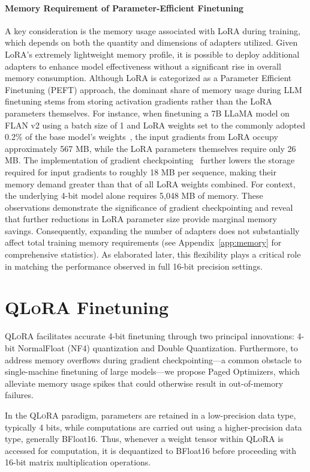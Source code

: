 \paragraph{Memory Requirement of Parameter-Efficient Finetuning} A key consideration is the memory usage associated with LoRA during training, which depends on both the quantity and dimensions of adapters utilized. Given LoRA’s extremely lightweight memory profile, it is possible to deploy additional adapters to enhance model effectiveness without a significant rise in overall memory consumption. Although LoRA is categorized as a Parameter Efficient Finetuning (PEFT) approach, the dominant share of memory usage during LLM finetuning stems from storing activation gradients rather than the LoRA parameters themselves. For instance, when finetuning a 7B LLaMA model on FLAN v2 using a batch size of 1 and LoRA weights set to the commonly adopted 0.2\% of the base model’s weights~\citep{hu2021lora,liu2022few}, the input gradients from LoRA occupy approximately 567 MB, while the LoRA parameters themselves require only 26 MB. The implementation of gradient checkpointing~\citep{chen2016training} further lowers the storage required for input gradients to roughly 18 MB per sequence, making their memory demand greater than that of all LoRA weights combined. For context, the underlying 4-bit model alone requires 5,048 MB of memory. These observations demonstrate the significance of gradient checkpointing and reveal that further reductions in LoRA parameter size provide marginal memory savings. Consequently, expanding the number of adapters does not substantially affect total training memory requirements (see Appendix~\ref{app:memory} for comprehensive statistics). As elaborated later, this flexibility plays a critical role in matching the performance observed in full 16-bit precision settings.

\section{\textsc{QLoRA} Finetuning}

\textsc{QLoRA} facilitates accurate 4-bit finetuning through two principal innovations: 4-bit NormalFloat (NF4) quantization and Double Quantization. Furthermore, to address memory overflows during gradient checkpointing—a common obstacle to single-machine finetuning of large models—we propose Paged Optimizers, which alleviate memory usage spikes that could otherwise result in out-of-memory failures.

In the \textsc{QLoRA} paradigm, parameters are retained in a low-precision data type, typically 4 bits, while computations are carried out using a higher-precision data type, generally BFloat16. Thus, whenever a weight tensor within \textsc{QLoRA} is accessed for computation, it is dequantized to BFloat16 before proceeding with 16-bit matrix multiplication operations.

